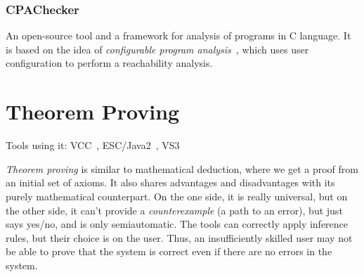\subsubsection{CPAChecker}
An open-source tool and a framework for analysis of programs in C language. It is based on the idea of {\em configurable program analysis}~\cite{CPAChecker}, which uses user configuration to perform a reachability analysis.


\section{Theorem Proving}\label{chap:fav:theoremProving}
Tools using it: VCC~\cite{KrenaVojnarOverview}, ESC/Java2~\cite{KrenaVojnarOverview}, VS3~\cite{KrenaVojnarOverview}

{\em Theorem proving} is similar to mathematical deduction, where we get a proof from an initial set of axioms. It also shares advantages and disadvantages with its purely mathematical counterpart. On the one side, it is really universal, but on the other side, it can't provide a {\em counterexample} (a path to an error), but just says yes/no, and is only semiautomatic. The tools can correctly apply inference rules, but their choice is on the user. Thus, an insufficiently skilled user may not be able to prove that the system is correct even if there are no errors in the system.


